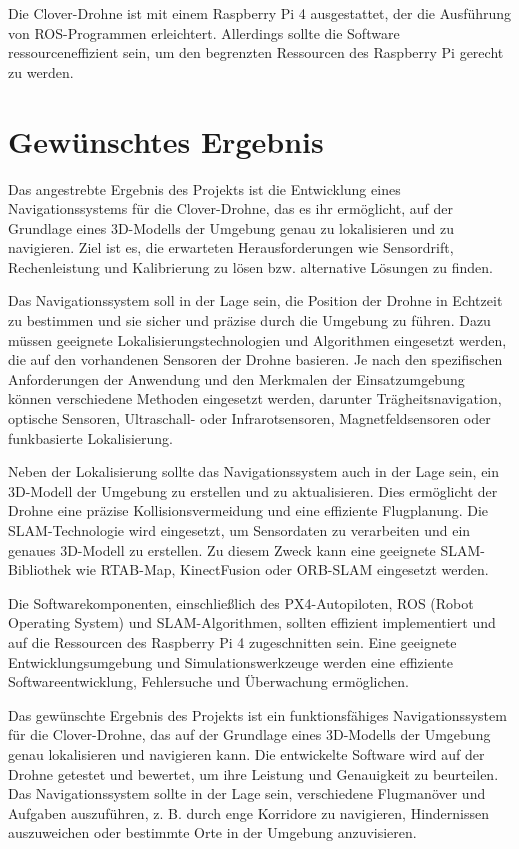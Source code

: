 Die Clover-Drohne ist mit einem Raspberry Pi 4 ausgestattet, der die Ausführung von ROS-Programmen erleichtert. Allerdings sollte die Software ressourceneffizient sein, um den begrenzten Ressourcen des Raspberry Pi gerecht zu werden.

\section{Gewünschtes Ergebnis} \label{gewuenschtes_ergebnis:section} 

Das angestrebte Ergebnis des Projekts ist die Entwicklung eines Navigationssystems für die Clover-Drohne, das es ihr ermöglicht, auf der Grundlage eines 3D-Modells der Umgebung genau zu lokalisieren und zu navigieren. Ziel ist es, die erwarteten Herausforderungen wie Sensordrift, Rechenleistung und Kalibrierung zu lösen bzw. alternative Lösungen zu finden.

Das Navigationssystem soll in der Lage sein, die Position der Drohne in Echtzeit zu bestimmen und sie sicher und präzise durch die Umgebung zu führen. Dazu müssen geeignete Lokalisierungstechnologien und Algorithmen eingesetzt werden, die auf den vorhandenen Sensoren der Drohne basieren. Je nach den spezifischen Anforderungen der Anwendung und den Merkmalen der Einsatzumgebung können verschiedene Methoden eingesetzt werden, darunter Trägheitsnavigation, optische Sensoren, Ultraschall- oder Infrarotsensoren, Magnetfeldsensoren oder funkbasierte Lokalisierung.

Neben der Lokalisierung sollte das Navigationssystem auch in der Lage sein, ein 3D-Modell der Umgebung zu erstellen und zu aktualisieren. Dies ermöglicht der Drohne eine präzise Kollisionsvermeidung und eine effiziente Flugplanung. Die \ac{SLAM}-Technologie wird eingesetzt, um Sensordaten zu verarbeiten und ein genaues 3D-Modell zu erstellen. Zu diesem Zweck kann eine geeignete \ac{SLAM}-Bibliothek wie RTAB-Map, KinectFusion oder ORB-SLAM eingesetzt werden.

Die Softwarekomponenten, einschließlich des PX4-Autopiloten, ROS (Robot Operating System) und \ac{SLAM}-Algorithmen, sollten effizient implementiert und auf die Ressourcen des Raspberry Pi 4 zugeschnitten sein. Eine geeignete Entwicklungsumgebung und Simulationswerkzeuge werden eine effiziente Softwareentwicklung, Fehlersuche und Überwachung ermöglichen.

Das gewünschte Ergebnis des Projekts ist ein funktionsfähiges Navigationssystem für die Clover-Drohne, das auf der Grundlage eines 3D-Modells der Umgebung genau lokalisieren und navigieren kann. Die entwickelte Software wird auf der Drohne getestet und bewertet, um ihre Leistung und Genauigkeit zu beurteilen. Das Navigationssystem sollte in der Lage sein, verschiedene Flugmanöver und Aufgaben auszuführen, z. B. durch enge Korridore zu navigieren, Hindernissen auszuweichen oder bestimmte Orte in der Umgebung anzuvisieren.

